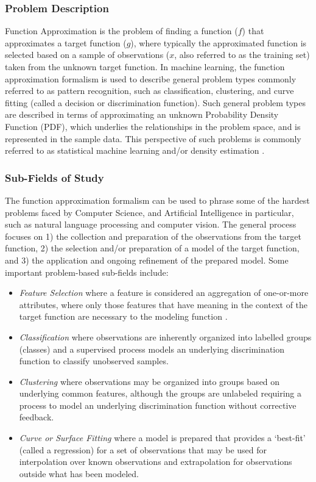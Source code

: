 \begin{bibunit}
\subsubsection{Problem Description}
Function Approximation is the problem of finding a function ($f$) that approximates a target function ($g$), where typically the approximated function is selected based on a sample of observations ($x$, also referred to as the training set) taken from the unknown target function.
In machine learning, the function approximation formalism is used to describe general problem types commonly referred to as pattern recognition, such as classification, clustering, and curve fitting (called a decision or discrimination function). Such general problem types are described in terms of approximating an unknown Probability Density Function (PDF), which underlies the relationships in the problem space, and is represented in the sample data. This perspective of such problems is commonly referred to as statistical machine learning and/or density estimation \cite{Fukunaga1990, Bishop1995}.

%
%
\subsubsection{Sub-Fields of Study}
The function approximation formalism can be used to phrase some of the hardest problems faced by Computer Science, and Artificial Intelligence in particular, such as natural language processing and computer vision. 
The general process focuses on 1) the collection and preparation of the observations from the target function, 2) the selection and/or preparation of a model of the target function, and 3) the application and ongoing refinement of the prepared model. 
Some important problem-based sub-fields include: 
\begin{itemize}
	\item \emph{Feature Selection} where a feature is considered an aggregation of one-or-more attributes, where only those features that have meaning in the context of the target function are necessary to the modeling function \cite{Kudo2000, Guyon2003}.
	\item \emph{Classification} where observations are inherently organized into labelled groups (classes) and a supervised process models an underlying discrimination function to classify unobserved samples.
	\item \emph{Clustering} where observations may be organized into groups based on underlying common features, although the groups are unlabeled requiring a process to model an underlying discrimination function without corrective feedback.
	\item \emph{Curve or Surface Fitting} where a model is prepared that provides a `best-fit' (called a regression) for a set of observations that may be used for interpolation over known observations and extrapolation for observations outside what has been modeled.
\end{itemize}


\end{bibunit}
